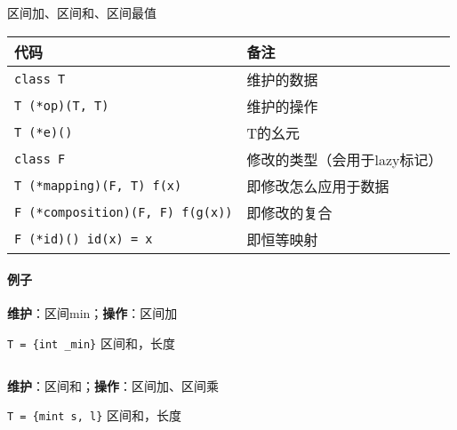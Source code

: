 区间加、区间和、区间最值

\begin{tabular}{ll}
    \hline
    代码                                    & 备注               \\
    \hline
    \verb|class T|                        & 维护的数据            \\
    \verb|T (*op)(T, T)|                  & 维护的操作            \\
    \verb|T (*e)()|                       & T的幺元             \\
    \verb|class F|                        & 修改的类型（会用于lazy标记） \\
    \verb|T (*mapping)(F, T) f(x)|        & 即修改怎么应用于数据       \\
    \verb|F (*composition)(F, F) f(g(x))| & 即修改的复合           \\
    \verb|F (*id)() id(x) = x|            & 即恒等映射            \\
    \hline
\end{tabular}

\paragraph{例子}

\textbf{维护}：区间min；\textbf{操作}：区间加

\verb|T = {int _min}| 区间和，长度

\inputminted{cpp}{src/src/segtree_eg1.txt}

\textbf{维护}：区间和；\textbf{操作}：区间加、区间乘

\verb|T = {mint s, l}| 区间和，长度

\inputminted{cpp}{src/src/segtree_eg2.txt}
